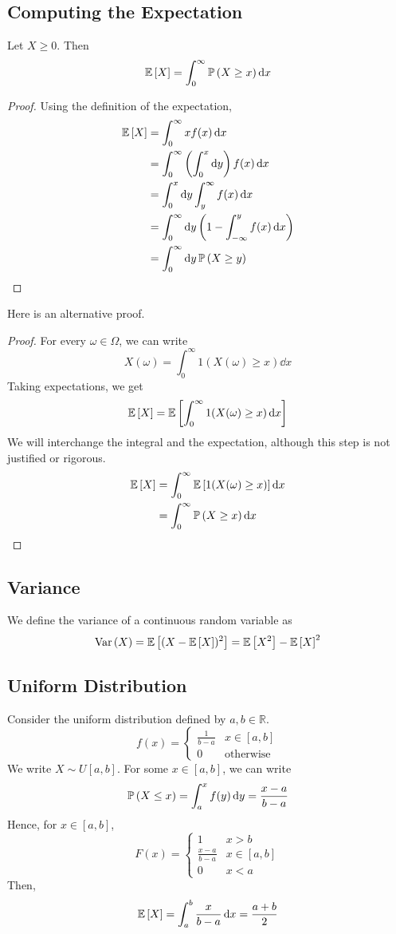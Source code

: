 \documentclass{article}
\begin{document}
\subsection{Computing the Expectation}
\begin{claim}
	Let $X \geq 0$. Then
	\[ \mathbb{E}\left[{X}\right] = \int_0^\infty \mathbb{P}\left({X \geq x}\right) \dd{x} \]
\end{claim}
\begin{proof}
	Using the definition of the expectation,
	\begin{align*}
		\mathbb{E}\left[{X}\right] & = \int_0^\infty xf(x) \dd{x}                                           \\
		           & = \int_0^\infty \left( \int_0^x \dd{y} \right) f(x) \dd{x}             \\
		           & = \int_0^x \dd{y} \int_y^\infty f(x) \dd{x}                            \\
		           & = \int_0^\infty \dd{y} \left( 1 - \int_{-\infty}^y f(x) \dd{x} \right) \\
		           & = \int_0^\infty \dd{y} \mathbb{P}\left({X \geq y}\right)
	\end{align*}
\end{proof}
\noindent Here is an alternative proof.
\begin{proof}
	For every $\omega \in \Omega$, we can write
	\[ X(\omega) = \int_0^\infty 1(X(\omega) \geq x) \dd{x} \]
	Taking expectations, we get
	\[ \mathbb{E}\left[{X}\right] = \mathbb{E}\left[{\int_0^\infty 1(X(\omega) \geq x) \dd{x}}\right] \]
	We will interchange the integral and the expectation, although this step is not justified or rigorous.
	\begin{align*}
		\mathbb{E}\left[{X}\right] & = \int_0^\infty \mathbb{E}\left[{1(X(\omega) \geq x)}\right] \dd{x} \\
		           & = \int_0^\infty \mathbb{P}\left({X \geq x}\right) \dd{x}
	\end{align*}
\end{proof}

\subsection{Variance}
We define the variance of a continuous random variable as
\[ \operatorname{Var}\left({X}\right) = \mathbb{E}\left[{(X - \mathbb{E}\left[{X}\right])^2}\right] = \mathbb{E}\left[{X^2}\right] - \mathbb{E}\left[{X}\right]^2 \]

\subsection{Uniform Distribution}
Consider the uniform distribution defined by $a, b \in\mathbb R$.
\[ f(x) = \begin{cases}
		\frac{1}{b-a} & x \in [a, b]     \\
		0             & \text{otherwise}
	\end{cases} \]
We write $X \sim U[a, b]$. For some $x \in [a,b]$, we can write
\[ \mathbb{P}\left({X \leq x}\right) = \int_a^x f(y) \dd{y} = \frac{x-a}{b-a} \]
Hence, for $x \in [a,b]$,
\[ F(x) = \begin{cases}
		1               & x > b       \\
		\frac{x-a}{b-a} & x \in [a,b] \\
		0               & x < a
	\end{cases} \]
Then,
\[ \mathbb{E}\left[{X}\right] = \int_a^b \frac{x}{b-a} \dd{x} = \frac{a+b}{2} \]
\end{document}
